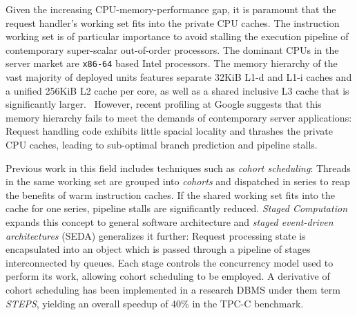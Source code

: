 \documentclass[12pt,a4paper]{book}
\begin{document}
Given the increasing CPU-memory-performance gap, it is paramount that the request handler's working set fits into the private CPU caches.
The instruction working set is of particular importance to avoid stalling the execution pipeline of contemporary super-scalar out-of-order processors.
The dominant CPUs in the server market are \texttt{x86-64} based Intel processors.
The memory hierarchy of the vast majority of deployed units features separate 32KiB L1-d and L1-i caches and a unified 256KiB L2 cache per core, as well as a shared inclusive L3 cache that is significantly larger.~\cite{nehalemCacheHierarchy}
However, recent profiling at Google suggests that this memory hierarchy fails to meet the demands of contemporary server applications:
Request handling code exhibits little spacial locality and thrashes the private CPU caches, leading to sub-optimal branch prediction and pipeline stalls.\cite{kanev2015profiling}

Previous work in this field includes techniques such as \emph{cohort scheduling}:
Threads in the same working set are grouped into \emph{cohorts} and dispatched in series to reap the benefits of warm instruction caches.
If the shared working set fits into the cache for one series, pipeline stalls are significantly reduced.
\emph{Staged Computation} expands this concept to general software architecture and \emph{staged event-driven architectures} (SEDA) generalizes it further:
Request processing state is encapsulated into an object which is passed through a pipeline of stages interconnected by queues.
Each stage controls the concurrency model used to perform its work, allowing cohort scheduling to be employed.
A derivative of cohort scheduling has been implemented in a research DBMS under them term \emph{STEPS}, yielding an overall speedup of 40\% in the TPC-C benchmark.\cite{cohort,seda,steps,harizopoulos2005staged}
\end{document}

